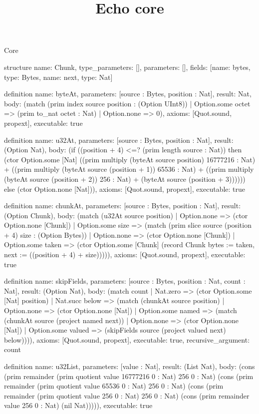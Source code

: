 \begin{lexlean}{Core}
\title{Echo core}
\begin{semanticmodule}
structure{
  name: Chunk,
  type_parameters: [],
  parameters: [],
  fields: [{name: bytes, type: Bytes}, {name: next, type: Nat}]
}

definition{
  name: byteAt,
  parameters: [source : Bytes, position : Nat],
  result: Nat,
  body: (match (prim index source position : (Option UInt8))
    | Option.some octet => (prim to_nat octet : Nat)
    | Option.none => 0),
  axioms: [Quot.sound, propext],
  executable: true
}

definition{
  name: u32At,
  parameters: [source : Bytes, position : Nat],
  result: (Option Nat),
  body: (if ((position + 4) <=? (prim length source : Nat)) then (ctor Option.some [Nat] ((prim multiply (byteAt source position) 16777216 : Nat) + ((prim multiply (byteAt source (position + 1)) 65536 : Nat) + ((prim multiply (byteAt source (position + 2)) 256 : Nat) + (byteAt source (position + 3)))))) else (ctor Option.none [Nat])),
  axioms: [Quot.sound, propext],
  executable: true
}

definition{
  name: chunkAt,
  parameters: [source : Bytes, position : Nat],
  result: (Option Chunk),
  body: (match (u32At source position)
    | Option.none => (ctor Option.none [Chunk])
    | Option.some size => (match (prim slice source (position + 4) size : (Option Bytes))
      | Option.none => (ctor Option.none [Chunk])
      | Option.some taken => (ctor Option.some [Chunk] (record Chunk {bytes := taken, next := ((position + 4) + size)})))),
  axioms: [Quot.sound, propext],
  executable: true
}

definition{
  name: skipFields,
  parameters: [source : Bytes, position : Nat, count : Nat],
  result: (Option Nat),
  body: (match count
    | Nat.zero => (ctor Option.some [Nat] position)
    | Nat.succ below => (match (chunkAt source position)
      | Option.none => (ctor Option.none [Nat])
      | Option.some named => (match (chunkAt source (project named next))
        | Option.none => (ctor Option.none [Nat])
        | Option.some valued => (skipFields source (project valued next) below)))),
  axioms: [Quot.sound, propext],
  executable: true,
  recursive_argument: count
}

definition{
  name: u32List,
  parameters: [value : Nat],
  result: (List Nat),
  body: (cons (prim remainder (prim quotient value 16777216 0 : Nat) 256 0 : Nat) (cons (prim remainder (prim quotient value 65536 0 : Nat) 256 0 : Nat) (cons (prim remainder (prim quotient value 256 0 : Nat) 256 0 : Nat) (cons (prim remainder value 256 0 : Nat) (nil Nat))))),
  executable: true
}


\end{semanticmodule}
\end{lexlean}
